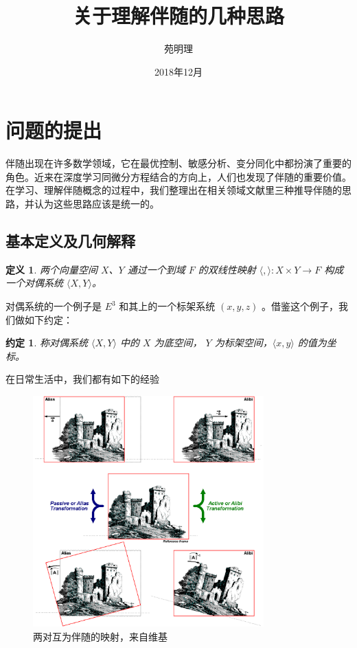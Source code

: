 \documentclass[a4paper,12pt]{article}
\title{关于理解伴随的几种思路}
\author{苑明理}
\date{2018年12月}
\newtheorem{definition}{定义}
\newtheorem{convention}{约定}
\begin{document}
\maketitle{}

\renewcommand\contentsname{目录}
\setcounter{tocdepth}{2}
\tableofcontents

\newpage

\section{问题的提出}

伴随出现在许多数学领域，它在最优控制、敏感分析、变分同化中都扮演了重要的角色。近来在深度学习同微分方程结合的方向上，人们也发现了伴随的重要价值。
在学习、理解伴随概念的过程中，我们整理出在相关领域文献里三种推导伴随的思路，并认为这些思路应该是统一的。

\subsection{基本定义及几何解释}

\begin{definition}
\label{d0}
两个向量空间 $X$、$Y$ 通过一个到域 $ F $ 的双线性映射 $ \langle , \rangle : X \times Y \to F $ 构成一个对偶系统 $ \langle X, Y \rangle $。
\end{definition}

对偶系统的一个例子是 $ E^3 $ 和其上的一个标架系统 $ (x, y, z) $ 。借鉴这个例子，我们做如下约定：

\begin{convention}
称对偶系统 $ \langle X, Y \rangle $ 中的 $ X $ 为底空间， $ Y $ 为标架空间，$ \langle x, y \rangle $ 的值为坐标。
\end{convention}

在日常生活中，我们都有如下的经验

\begin{figure}[ht]
\centering
\includegraphics[width=3.5in]{images/adjoint/alias_and_alibi.png}
\caption{两对互为伴随的映射，来自维基}
\end{figure}
\end{document}
